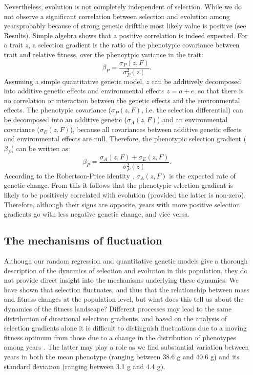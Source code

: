 Nevertheless, evolution is not completely independent of selection. While we do not observe a significant correlation between selection and evolution among years\textemdash probably because of strong genetic drift\textemdash the most likely value is positive (see Results). 
Simple algebra shows that a positive correlation is indeed expected. For a trait $z$, a selection gradient is the ratio of the phenotypic covariance between trait and relative fitness, over the phenoytpic variance in the trait:
\begin{equation*}
\beta_P = \frac{\sigma_P(z, F)}{\sigma^2_P(z)} \text{.}
\end{equation*}
Assuming a simple quantitative genetic model, $z$ can be additively decomposed into additive genetic effects and environmental effects $z = a + e$, so that there is no correlation or interaction between the genetic effects and the environmental effects. The phenotypic covariance ($\sigma_P(z, F)$, i.e. the selection differential) can be decomposed into an additive genetic ($\sigma_A(z,F)$) and an environmental covariance ($\sigma_E(z,F)$), because all covariances between additive genetic effects and environmental effects are null. Therefore, the phenotypic selection gradient ($\beta_P$) can be written as:
\begin{equation*}
\beta_P = \frac{\sigma_A(z,F)+\sigma_E(z,F)}{\sigma^2_P(z)} \text{.}
\end{equation*}
According to the Robertson-Price identity \parencite{Robertson1966, Price1970}, $\sigma_A(z,F)$ is the expected rate of genetic change. From this it follows that the phenotypic selection gradient is likely to be positively correlated with evolution (provided the latter is non-zero). Therefore, although their signs are opposite, years with more positive selection gradients go with less negative genetic change, and vice versa. 

\subsection*{The mechanisms of fluctuation}
Although our random regression and quantitative genetic models give a thorough description of the dynamics of selection and evolution in this population, they do not provide direct insight into the mechanisms underlying these dynamics. We have shown that selection fluctuates, and thus that the relationship between mass and fitness changes at the population level, but what does this tell us about the dynamics of the fitness landscape? Different processes may lead to the same distribution of directional selection gradients, and based on the analysis of selection gradients alone it is difficult to distinguish fluctuations due to a moving fitness optimum from those due to a change in the distribution of phenotypes among years \parencite{Chevin2014}. The latter may play a role as we find substantial variation between years in both the mean phenotype (ranging between 38.6 g and 40.6 g) and its standard deviation (ranging between 3.1 g and 4.4 g).

